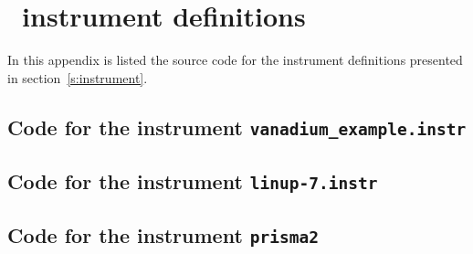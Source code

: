 \chapter{\MCS\ instrument definitions}
\label{instcode}

In this appendix is listed the source code for the instrument
definitions presented in section~\ref{s:instrument}.


\section{Code for the instrument \texttt{vanadium\_example.instr}}
\label{a:vanadium_example.instr}
\newpage


\section{Code for the instrument \texttt{linup-7.instr}}
\newpage


\section{Code for the instrument \texttt{prisma2}}
\newpage

